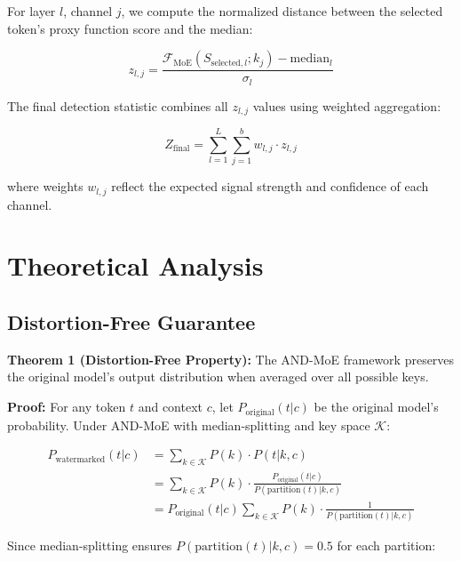 \documentclass[letterpaper,twocolumn,10pt]{article}
\begin{document}
For layer $l$, channel $j$, we compute the normalized distance between the selected token's proxy function score and the median:

\begin{equation}
z_{l,j} = \frac{\mathcal{F}_{\text{MoE}}(S_{\text{selected},l}; k_j) - \text{median}_l}{\sigma_l}
\end{equation}

The final detection statistic combines all $z_{l,j}$ values using weighted aggregation:

\begin{equation}
Z_{\text{final}} = \sum_{l=1}^L \sum_{j=1}^b w_{l,j} \cdot z_{l,j}
\end{equation}

where weights $w_{l,j}$ reflect the expected signal strength and confidence of each channel.

\section{Theoretical Analysis}

\subsection{Distortion-Free Guarantee}

\textbf{Theorem 1 (Distortion-Free Property):} The AND-MoE framework preserves the original model's output distribution when averaged over all possible keys.

\textbf{Proof:} For any token $t$ and context $c$, let $P_{\text{original}}(t|c)$ be the original model's probability. Under AND-MoE with median-splitting and key space $\mathcal{K}$:

\begin{align}
P_{\text{watermarked}}(t|c) &= \sum_{k \in \mathcal{K}} P(k) \cdot P(t|k, c) \\
&= \sum_{k \in \mathcal{K}} P(k) \cdot \frac{P_{\text{original}}(t|c)}{P(\text{partition}(t)|k, c)} \\
&= P_{\text{original}}(t|c) \sum_{k \in \mathcal{K}} P(k) \cdot \frac{1}{P(\text{partition}(t)|k, c)}
\end{align}

Since median-splitting ensures $P(\text{partition}(t)|k, c) = 0.5$ for each partition:
\end{document}
